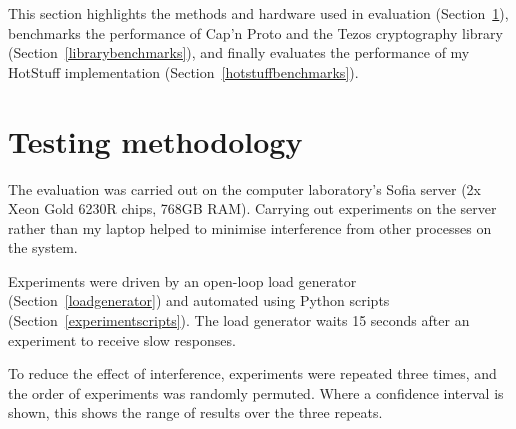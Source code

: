 



This section highlights the methods and hardware used in evaluation (Section~\ref{testingmethods}), benchmarks the performance of Cap'n Proto and the Tezos cryptography library (Section~\ref{librarybenchmarks}), and finally evaluates the performance of my HotStuff implementation (Section~\ref{hotstuffbenchmarks}).

\section{Testing methodology} \label{testingmethods}
The evaluation was carried out on the computer laboratory's Sofia server (2x Xeon Gold 6230R chips, 768GB RAM). Carrying out experiments on the server rather than my laptop helped to minimise interference from other processes on the system.

Experiments were driven by an open-loop load generator (Section~\ref{loadgenerator}) and automated using Python scripts (Section~\ref{experimentscripts}). The load generator waits 15 seconds after an experiment to receive slow responses.

To reduce the effect of interference, experiments were repeated three times, and the order of experiments was randomly permuted. Where a confidence interval is shown, this shows the range of results over the three repeats.

